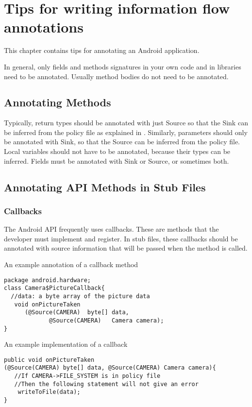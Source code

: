 \htmlhr
\chapter{Tips for writing information flow annotations\label{app-annotation}}

This chapter contains tips for annotating an Android application.

In general, only fields and methods signatures in your own code and in
libraries need to be annotated. Usually method bodies do not need to be
annotated.


\section{Annotating  Methods\label{sec:annomethods}}

Typically, return types should be annotated with just Source so that the Sink can be
 inferred from the policy file as explained in . Similarly, parameters should
  only be annotated with Sink, so that the Source can be inferred from  the policy file.
    Local variables should not have to be annotated, because their types can be inferred. Fields 
    must be annotated with  Sink or Source, or sometimes both. 

\section{Annotating API Methods in Stub Files\label{sec:annoAPI}}

\subsection{Callbacks}
The Android API frequently uses callbacks.  These are methods that the developer must 
implement and register.  In stub files, these callbacks should be annotated
with source information that will be passed when the method is called.  

An example annotation of a callback method
\begin{Verbatim}
package android.hardware;
class Camera$PictureCallback{
  //data: a byte array of the picture data
   void onPictureTaken 
      (@Source(CAMERA)  byte[] data, 
             @Source(CAMERA)   Camera camera);
}
\end{Verbatim}

An example implementation of a callback
\begin{Verbatim}
public void onPictureTaken
(@Source(CAMERA) byte[] data, @Source(CAMERA) Camera camera){
   //If CAMERA->FILE_SYSTEM is in policy file
   //Then the following statement will not give an error
    writeToFile(data);
}
\end{Verbatim}


